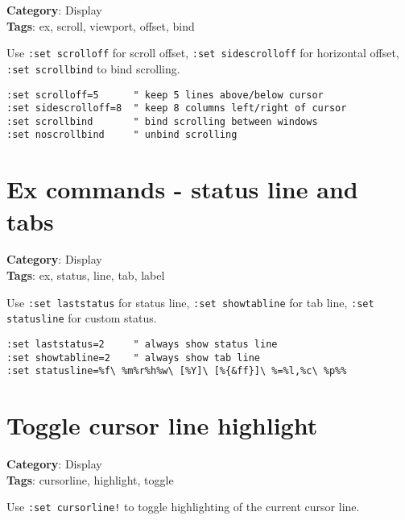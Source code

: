 {{{\textbf{Category}: Display\\ \textbf{Tags}: ex, scroll, viewport, offset, bind
\vspace{0.5cm}

Use {\footnotesize \Verb§:set scrolloff§} for scroll offset, {\footnotesize \Verb§:set sidescrolloff§} for horizontal offset, {\footnotesize \Verb§:set scrollbind§} to bind scrolling.

\begin{Exa*}{}
\begin{Verbatim}[fontsize=\footnotesize, breaklines, breakanywhere]
:set scrolloff=5      " keep 5 lines above/below cursor
:set sidescrolloff=8  " keep 8 columns left/right of cursor
:set scrollbind       " bind scrolling between windows
:set noscrollbind     " unbind scrolling
\end{Verbatim}
\end{Exa*}

\section{Ex commands - status line and tabs}

\textbf{Category}: Display\\ \textbf{Tags}: ex, status, line, tab, label
\vspace{0.5cm}

Use {\footnotesize \Verb§:set laststatus§} for status line, {\footnotesize \Verb§:set showtabline§} for tab line, {\footnotesize \Verb§:set statusline§} for custom status.

\begin{Exa*}{}
\begin{Verbatim}[fontsize=\footnotesize, breaklines, breakanywhere]
:set laststatus=2     " always show status line
:set showtabline=2    " always show tab line
:set statusline=%f\ %m%r%h%w\ [%Y]\ [%{&ff}]\ %=%l,%c\ %p%%
\end{Verbatim}
\end{Exa*}

\section{Toggle cursor line highlight}

\textbf{Category}: Display\\ \textbf{Tags}: cursorline, highlight, toggle
\vspace{0.5cm}

Use {\footnotesize \Verb§:set cursorline!§} to toggle highlighting of the current cursor line.

}}}
